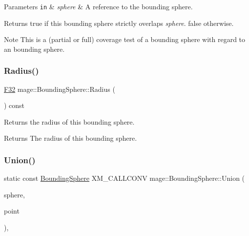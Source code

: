 \begin{DoxyParams}[1]{Parameters}
\mbox{\tt in}  & {\em sphere} & A reference to the bounding sphere. \\
\hline
\end{DoxyParams}
\begin{DoxyReturn}{Returns}
{\ttfamily true} if this bounding sphere strictly overlaps {\itshape sphere}. {\ttfamily false} otherwise. 
\end{DoxyReturn}
\begin{DoxyNote}{Note}
This is a (partial or full) coverage test of a bounding sphere with regard to an bounding sphere. 
\end{DoxyNote}
\hypertarget{classmage_1_1_bounding_sphere_a51c7e6db89c68d192961bfaf2114fb2f}{}\label{classmage_1_1_bounding_sphere_a51c7e6db89c68d192961bfaf2114fb2f} 
\subsubsection{\texorpdfstring{Radius()}{Radius()}}
{\footnotesize\ttfamily \hyperlink{namespacemage_aa97e833b45f06d60a0a9c4fc22ae02c0}{F32} mage\+::\+Bounding\+Sphere\+::\+Radius (\begin{DoxyParamCaption}{ }\end{DoxyParamCaption}) const\hspace{0.3cm}{\ttfamily [noexcept]}}

Returns the radius of this bounding sphere.

\begin{DoxyReturn}{Returns}
The radius of this bounding sphere. 
\end{DoxyReturn}
\hypertarget{classmage_1_1_bounding_sphere_a519f2f7bf6439ea384d5da60557223bf}{}\label{classmage_1_1_bounding_sphere_a519f2f7bf6439ea384d5da60557223bf} 
\subsubsection{\texorpdfstring{Union()}{Union()}\hspace{0.1cm}{\footnotesize\ttfamily [1/3]}}
{\footnotesize\ttfamily static const \hyperlink{classmage_1_1_bounding_sphere}{Bounding\+Sphere} X\+M\+\_\+\+C\+A\+L\+L\+C\+O\+NV mage\+::\+Bounding\+Sphere\+::\+Union (\begin{DoxyParamCaption}\item[{const \hyperlink{classmage_1_1_bounding_sphere}{Bounding\+Sphere} \&}]{sphere,  }\item[{const \hyperlink{structmage_1_1_point3}{Point3} \&}]{point }\end{DoxyParamCaption})\hspace{0.3cm}{\ttfamily [static]}, {\ttfamily [noexcept]}}

